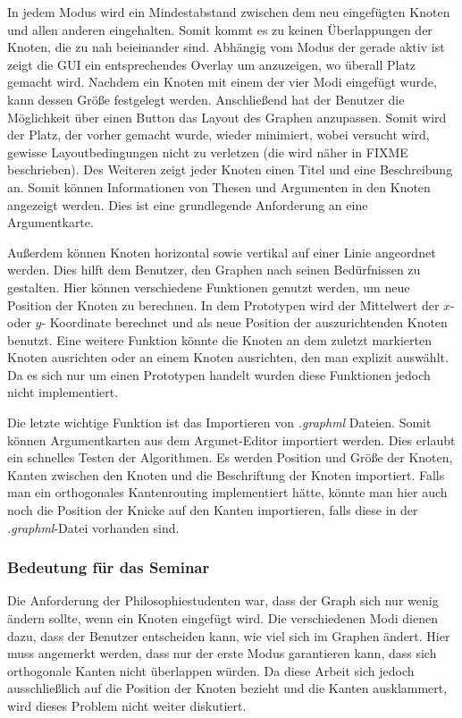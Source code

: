 In jedem Modus wird ein Mindestabstand zwischen dem neu eingefügten Knoten und allen
anderen eingehalten. Somit kommt es zu keinen Überlappungen der Knoten, die zu nah
beieinander sind. Abhängig vom Modus der gerade aktiv ist zeigt die GUI ein entsprechendes
Overlay um anzuzeigen, wo überall Platz gemacht wird. Nachdem ein Knoten mit einem der
vier Modi eingefügt wurde, kann dessen Größe festgelegt werden. Anschließend hat der
Benutzer die Möglichkeit über einen Button das Layout des Graphen anzupassen. Somit wird
der Platz, der vorher gemacht wurde, wieder minimiert, wobei versucht wird, gewisse
Layoutbedingungen nicht zu verletzen (die wird näher in FIXME beschrieben).
Des Weiteren zeigt jeder Knoten einen Titel und eine Beschreibung an. Somit können
Informationen von Thesen und Argumenten in den Knoten angezeigt werden. Dies ist eine
grundlegende Anforderung an eine Argumentkarte.

Außerdem können Knoten horizontal sowie vertikal auf einer Linie angeordnet werden. Dies
hilft dem Benutzer, den Graphen nach seinen Bedürfnissen zu gestalten. Hier können
verschiedene Funktionen genutzt werden, um neue Position der Knoten zu berechnen. In
dem Prototypen wird der Mittelwert der $x$- oder $y$- Koordinate berechnet und als neue Position
der auszurichtenden Knoten benutzt. Eine weitere Funktion könnte die Knoten an dem zuletzt
markierten Knoten ausrichten oder an einem Knoten ausrichten, den man explizit auswählt.
Da es sich nur um einen Prototypen handelt wurden diese Funktionen jedoch nicht
implementiert.

Die letzte wichtige Funktion ist das Importieren von \textit{.graphml} Dateien. Somit können
Argumentkarten aus dem Argunet-Editor importiert werden. Dies erlaubt ein schnelles Testen
der Algorithmen. Es werden Position und Größe der Knoten, Kanten zwischen den Knoten
und die Beschriftung der Knoten importiert. Falls man ein orthogonales Kantenrouting
implementiert hätte, könnte man hier auch noch die Position der Knicke auf den Kanten
importieren, falls diese in der \textit{.graphml}-Datei vorhanden sind.

\subsubsection{Bedeutung für das Seminar}

Die Anforderung der Philosophiestudenten war, dass der Graph sich nur wenig ändern sollte,
wenn ein Knoten eingefügt wird. Die verschiedenen Modi dienen dazu, dass der Benutzer
entscheiden kann, wie viel sich im Graphen ändert. Hier muss angemerkt werden, dass nur
der erste Modus garantieren kann, dass sich orthogonale Kanten nicht überlappen würden.
Da diese Arbeit sich jedoch ausschließlich auf die Position der Knoten bezieht und die Kanten
ausklammert, wird dieses Problem nicht weiter diskutiert.

